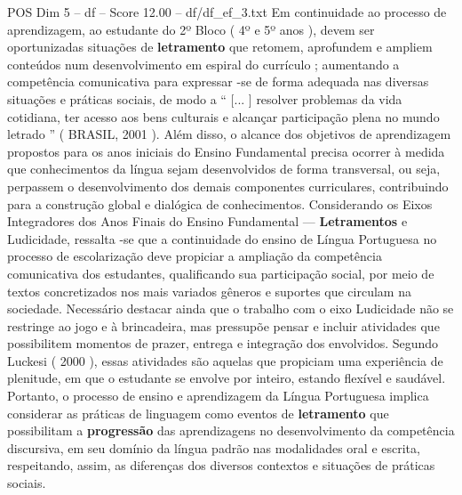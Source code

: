 \begin{textsample}{POS Dim 5 – df – Score 12.00 – df/df\_ef\_3.txt}
Em continuidade ao processo de aprendizagem, ao estudante do 2º Bloco ( 4º e 5º anos ), devem ser oportunizadas situações de \textbf{letramento} que retomem, aprofundem e ampliem conteúdos num desenvolvimento em espiral do currículo ; aumentando a competência comunicativa para expressar -se de forma adequada nas diversas situações e práticas sociais, de modo a “ [... ] resolver problemas da vida cotidiana, ter acesso aos bens culturais e alcançar participação plena no mundo letrado ” ( BRASIL, 2001 ).
Além disso, o alcance dos objetivos de aprendizagem propostos para os anos iniciais do Ensino Fundamental precisa ocorrer à medida que conhecimentos da língua sejam desenvolvidos de forma transversal, ou seja, perpassem o desenvolvimento dos demais componentes curriculares, contribuindo para a construção global e dialógica de conhecimentos.
Considerando os Eixos Integradores dos Anos Finais do Ensino Fundamental — \textbf{Letramentos} e Ludicidade, ressalta -se que a continuidade do ensino de Língua Portuguesa no processo de escolarização deve propiciar a ampliação da competência comunicativa dos estudantes, qualificando sua participação social, por meio de textos concretizados nos mais variados gêneros e suportes que circulam na sociedade.
Necessário destacar ainda que o trabalho com o eixo Ludicidade não se restringe ao jogo e à brincadeira, mas pressupõe pensar e incluir atividades que possibilitem momentos de prazer, entrega e integração dos envolvidos.
Segundo Luckesi ( 2000 ), essas atividades são aquelas que propiciam uma experiência de plenitude, em que o estudante se envolve por inteiro, estando flexível e saudável.
Portanto, o processo de ensino e aprendizagem da Língua Portuguesa implica considerar as práticas de linguagem como eventos de \textbf{letramento} que possibilitam a \textbf{progressão} das aprendizagens no desenvolvimento da competência discursiva, em seu domínio da língua padrão nas modalidades oral e escrita, respeitando, assim, as diferenças dos diversos contextos e situações de práticas sociais.

\end{textsample}

